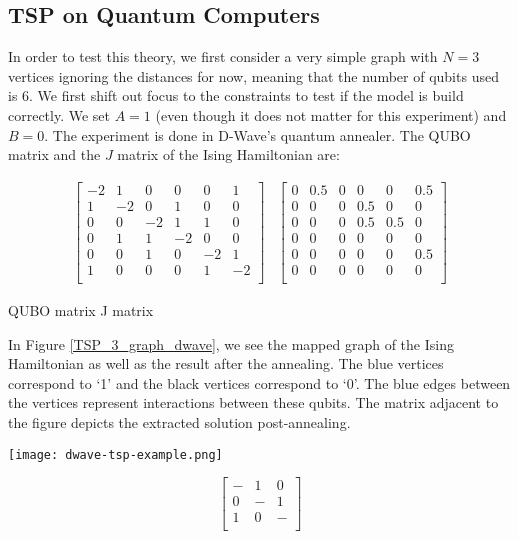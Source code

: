 \documentclass[12pt,a4paper]{report}
\begin{document}
\newpage
\subsection{TSP on Quantum Computers}
\noindent
In order to test this theory, we first consider a very simple graph with \(N=3\) vertices ignoring the distances for now, meaning that the number of qubits used is 6. We first shift out focus to the constraints to test if the model is build correctly. We set \( A = 1 \) (even though it does not matter for this experiment) and \(B=0\). The experiment is done in D-Wave's quantum annealer. The QUBO matrix and the \(J\) matrix of the Ising Hamiltonian are:

\[
\begin{array}{cc}
\begin{bmatrix}
-2 & 1 & 0 & 0 & 0 & 1 \\
1 & -2 & 0 & 1 & 0 & 0 \\
0 & 0 & -2 & 1 & 1 & 0 \\
0 & 1 & 1 & -2 & 0 & 0 \\
0 & 0 & 1 & 0 & -2 & 1 \\
1 & 0 & 0 & 0 & 1 & -2 \\
\end{bmatrix}
&
\begin{bmatrix}
0 & 0.5 & 0 & 0 & 0 & 0.5 \\
0 & 0 & 0 & 0.5 & 0 & 0 \\
0 & 0 & 0 & 0.5 & 0.5 & 0 \\
0 & 0 & 0 & 0 & 0 & 0 \\
0 & 0 & 0 & 0 & 0 & 0.5 \\
0 & 0 & 0 & 0 & 0 & 0 \\
\end{bmatrix}
\end{array}
\]

\begin{center}
QUBO matrix \hspace{3cm} J matrix
\end{center}

\noindent
In Figure \ref{TSP_3_graph_dwave}, we see the mapped graph of the Ising Hamiltonian as well as the result after the annealing. The blue vertices correspond to `1' and the black vertices correspond to `0'. The blue edges between the vertices represent interactions between these qubits. The matrix adjacent to the figure depicts the extracted solution post-annealing.


\noindent
\begin{minipage}{0.5\textwidth}
\centering
\texttt{[image: dwave-tsp-example.png]}
\label{TSP_3_graph_dwave}
\end{minipage}%
\begin{minipage}{0.5\textwidth}
\centering
\[
\begin{bmatrix}
- & 1 & 0 \\
0 & - & 1 \\
1 & 0 & - \\
\end{bmatrix}
\]
\end{minipage}
\\
\\
\end{document}
